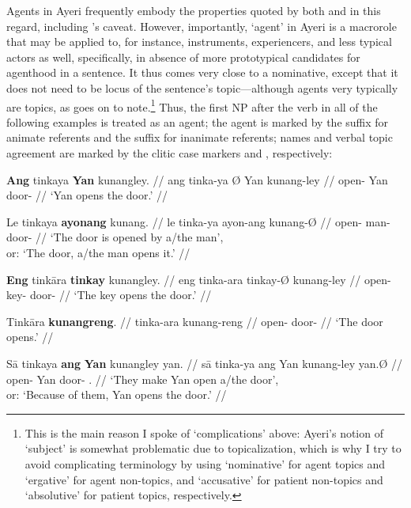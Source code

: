 Agents in Ayeri frequently embody the properties quoted by both
\citet{fillmore1968} and \citet{payne1997} in this regard, including 
\citet{fillmore1968}'s caveat. However, importantly, `agent' in Ayeri is 
a macrorole that may be applied to, for instance, instruments, experiencers,
and less typical actors as well, specifically, in absence of more prototypical
candidates for agenthood in a sentence. It thus comes very close to a
nominative, except that it does not need to be locus of the sentence's
topic---although agents very typically are topics, as
\citet[151]{payne1997} goes on to note.\footnote{This is the main reason I 
spoke of `complications' above: Ayeri's notion of `subject' is somewhat
problematic due to topicalization, which is why I try to avoid complicating
terminology by using `nominative' for agent topics and `ergative' for agent
non-topics, and `accusative' for patient non-topics and `absolutive' for
patient topics, respectively.} Thus, the first NP after the verb in all of the
following examples is treated as an agent; the agent is marked by the suffix
 for animate referents and the suffix  for 
inanimate referents; names and verbal topic agreement are marked by the clitic
case markers  and , respectively:

\pex
\a\begingl
	\gla \textbf{Ang} tinkaya {} \textbf{Yan} kunangley. //
	\glb ang tinka-ya Ø Yan kunang-ley //
	\glc \AgtT{} open-\TsgM{} \Top{} Yan door-\PargI{} //
	\glft `Yan opens the door.' //
\endgl

\a\begingl
	\gla Le tinkaya \textbf{ayonang} kunang. //
	\glb le tinka-ya ayon-ang kunang-Ø //
	\glc \PatT{} open-\TsgM{} man-\Aarg{} door-\Top{} //
	\glft `The door is opened by a/the man',\\
		or: `The door, a/the man opens it.' //
\endgl

\a\begingl
	\gla \textbf{Eng} tinkāra \textbf{tinkay} kunangley. //
	\glb eng tinka-ara tinkay-Ø kunang-ley //
	\glc \AgtTI{} open-\TsgI{} key-\Top{} door-\PargI{} //
	\glft `The key opens the door.' //
\endgl

\a\begingl
	\gla Tinkāra \textbf{kunangreng}. //
	\glb tinka-ara kunang-reng //
	\glc open-\TsgI{} door-\AargI{} //
	\glft `The door opens.' //
\endgl

\a\begingl
	\gla Sā tinkaya \textbf{ang} \textbf{Yan} kunangley yan. //
	\glb sā tinka-ya ang Yan kunang-ley yan.Ø //
	\glc \CauT{} open-\TsgM{} \Aarg{} Yan door-\PargI{} \TsgM{}.\Top{} //
	\glft `They make Yan open a/the door',\\
		or: `Because of them, Yan opens the door.' //
\endgl

